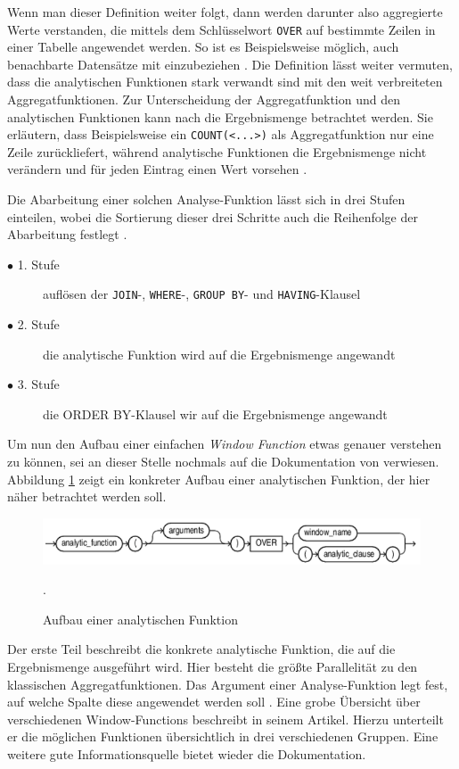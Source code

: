 Wenn man dieser Definition weiter folgt, dann werden darunter also aggregierte
Werte verstanden, die mittels dem Schlüsselwort \texttt{OVER} auf bestimmte
Zeilen in einer Tabelle angewendet werden. So ist es Beispielsweise möglich,
auch benachbarte Datensätze mit einzubeziehen \citep[vgl.][K. 7]{oracle}. Die
Definition lässt weiter vermuten, dass die analytischen Funktionen stark verwandt
sind mit den weit verbreiteten Aggregatfunktionen. Zur Unterscheidung der
Aggregatfunktion und den analytischen Funktionen kann nach \citet[S. 36]{Nuijten2023}
die Ergebnismenge betrachtet werden. Sie erläutern, dass Beispielsweise ein \texttt{COUNT(<...>)}
als Aggregatfunktion nur eine Zeile zurückliefert, während analytische Funktionen
die Ergebnismenge nicht verändern und für jeden Eintrag einen Wert vorsehen \citep[vgl.][S.
36]{Nuijten2023}.

Die Abarbeitung einer solchen Analyse-Funktion lässt sich in drei Stufen
einteilen, wobei die Sortierung dieser drei Schritte auch die Reihenfolge der Abarbeitung
festlegt \citep[vgl.][S. 35]{Nuijten2023}.
\begin{description}
	\item[$\bullet$ 1. Stufe] auflösen der \texttt{JOIN}-, \texttt{WHERE}-, \texttt{GROUP
		BY}- und \texttt{HAVING}-Klausel

	\item[$\bullet$ 2. Stufe] die analytische Funktion wird auf die Ergebnismenge angewandt

	\item[$\bullet$ 3. Stufe] die ORDER BY-Klausel wir auf die Ergebnismenge angewandt
\end{description}
Um nun den Aufbau einer einfachen \textit{Window Function} etwas genauer
verstehen zu können, sei an dieser Stelle nochmals auf die Dokumentation von \citet[K.~7]{oracle}
verwiesen. Abbildung \ref{fig:aufbauAnalyticFunction} zeigt ein konkreter Aufbau
einer analytischen Funktion, der hier näher betrachtet werden soll.
\begin{figure}[h]
	\centering
	\includegraphics[scale=0.5]{img/aufbauAnalyticFunction.jpg}
	\caption{ Aufbau einer analytischen Funktion \citep[vgl.][K. 7]{oracle}}
	. \label{fig:aufbauAnalyticFunction}
\end{figure}
Der erste Teil beschreibt die konkrete analytische Funktion, die auf die
Ergebnismenge ausgeführt wird. Hier besteht die größte Parallelität zu den klassischen
Aggregatfunktionen. Das Argument einer Analyse-Funktion legt fest, auf welche Spalte
diese angewendet werden soll \citep[vgl.][S.~110]{schicker2017datenbanken}. Eine
grobe Übersicht über verschiedenen Window-Functions beschreibt \citet[]{ibrahaim23}
in seinem Artikel. Hierzu unterteilt er die möglichen Funktionen übersichtlich in
drei verschiedenen Gruppen. Eine weitere gute Informationsquelle bietet wieder
die \citet[K.~7]{oracle} Dokumentation.

